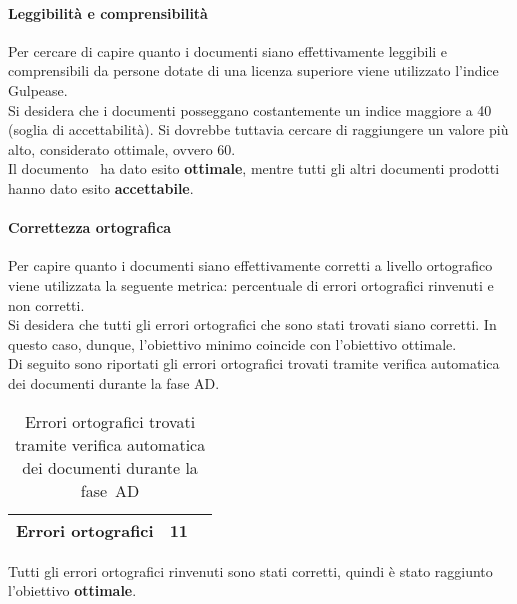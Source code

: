 \documentclass[../PianoDiQualifica.tex]{subfiles}
\begin{document}
\begin{appendices}
			\paragraph{Leggibilità e comprensibilità}
			Per cercare di capire quanto i documenti siano effettivamente leggibili e comprensibili da persone dotate di una licenza superiore viene utilizzato l’indice Gulpease\g.\\
			Si desidera che i documenti posseggano costantemente un indice maggiore a 40 (soglia di accettabilità). Si dovrebbe tuttavia cercare di raggiungere un valore più alto, considerato ottimale, ovvero 60.\\
			Il documento \glossariov\ ha dato esito \textbf{ottimale}, mentre tutti gli altri documenti prodotti hanno dato esito \textbf{accettabile}.
			
			\paragraph{Correttezza ortografica}
			Per capire quanto i documenti siano effettivamente corretti a livello ortografico viene utilizzata la seguente metrica: percentuale di errori ortografici rinvenuti e non corretti.\\
			Si desidera che tutti gli errori ortografici che sono stati trovati siano corretti. In questo caso, dunque, l'obiettivo minimo coincide con l’obiettivo ottimale.\\
			Di seguito sono riportati gli errori ortografici trovati tramite verifica automatica dei documenti durante la fase AD.
			\begin{table}[H]
				\centering
				\begin{tabular}{l * {2}{c}}
					\midrule
					Errori ortografici & 11 \\
					\midrule
				\end{tabular}
				\caption{Errori ortografici trovati tramite verifica automatica dei documenti durante la fase\g\ AD}
				\label{tab:errori_automatica}
			\end{table}
			Tutti gli errori ortografici rinvenuti sono stati corretti, quindi è stato raggiunto l'obiettivo \textbf{ottimale}.
			

\end{appendices}
\end{document}
